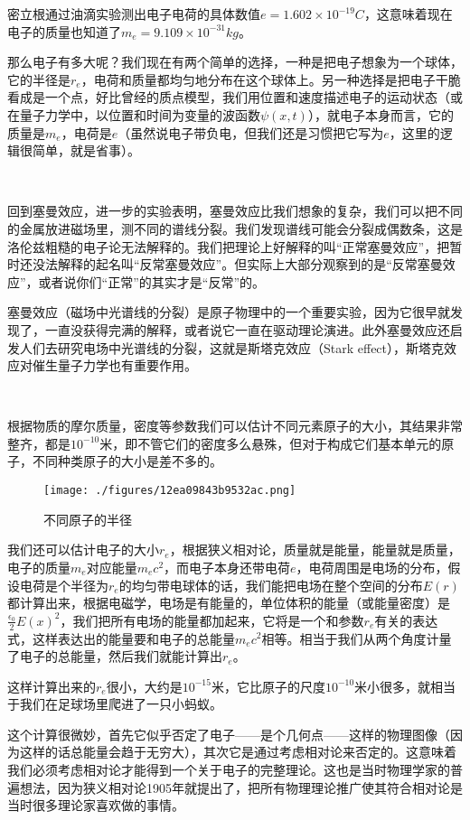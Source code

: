 密立根通过油滴实验测出电子电荷的具体数值$e = 1.602 \times 10^{-19} C$，这意味着现在电子的质量也知道了$m_e = 9.109 \times 10^{-31} kg$。

那么电子有多大呢？我们现在有两个简单的选择，一种是把电子想象为一个球体，它的半径是$r_e$，电荷和质量都均匀地分布在这个球体上。另一种选择是把电子干脆看成是一个点，好比曾经的质点模型，我们用位置和速度描述电子的运动状态（或在量子力学中，以位置和时间为变量的波函数$\psi(x,t)$），就电子本身而言，它的质量是$m_e$，电荷是$e$（虽然说电子带负电，但我们还是习惯把它写为$e$，这里的逻辑很简单，就是省事）。

~

回到塞曼效应，进一步的实验表明，塞曼效应比我们想象的复杂，我们可以把不同的金属放进磁场里，测不同的谱线分裂。我们发现谱线可能会分裂成偶数条，这是洛伦兹粗糙的电子论无法解释的。我们把理论上好解释的叫“正常塞曼效应”，把暂时还没法解释的起名叫“反常塞曼效应”。但实际上大部分观察到的是“反常塞曼效应”，或者说你们“正常”的其实才是“反常”的。

塞曼效应（磁场中光谱线的分裂）是原子物理中的一个重要实验，因为它很早就发现了，一直没获得完满的解释，或者说它一直在驱动理论演进。此外塞曼效应还启发人们去研究电场中光谱线的分裂，这就是斯塔克效应（Stark effect），斯塔克效应对催生量子力学也有重要作用。

~

根据物质的摩尔质量，密度等参数我们可以估计不同元素原子的大小，其结果非常整齐，都是$10^{-10}$米，即不管它们的密度多么悬殊，但对于构成它们基本单元的原子，不同种类原子的大小是差不多的。

\begin{figure}[ht]
\centering
\texttt{[image: ./figures/12ea09843b9532ac.png]}
\caption{不同原子的半径} \label{fig_QMPre2_10}
\end{figure}

我们还可以估计电子的大小$r_e$，根据狭义相对论，质量就是能量，能量就是质量，电子的质量$m_e$对应能量$m_e c^2$，而电子本身还带电荷$e$，电荷周围是电场的分布，假设电荷是个半径为$r_e$的均匀带电球体的话，我们能把电场在整个空间的分布$E(r) $都计算出来，根据电磁学，电场是有能量的，单位体积的能量（或能量密度）是$ \frac{\epsilon_0}{2} E(x)^2$，我们把所有电场的能量都加起来，它将是一个和参数$r_e$有关的表达式，这样表达出的能量要和电子的总能量$m_e c^2$相等。相当于我们从两个角度计量了电子的总能量，然后我们就能计算出$r_e$。

这样计算出来的$r_e$很小，大约是$10^{-15}$米，它比原子的尺度$10^{-10}$米小很多，就相当于我们在足球场里爬进了一只小蚂蚁。

这个计算很微妙，首先它似乎否定了电子——是个几何点——这样的物理图像（因为这样的话总能量会趋于无穷大），其次它是通过考虑相对论来否定的。这意味着我们必须考虑相对论才能得到一个关于电子的完整理论。这也是当时物理学家的普遍想法，因为狭义相对论1905年就提出了，把所有物理理论推广使其符合相对论是当时很多理论家喜欢做的事情。

